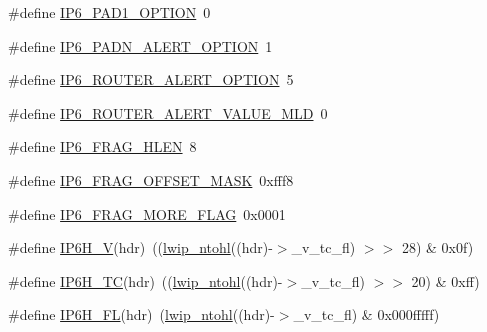 \begin{DoxyCompactItemize}
\#define \hyperlink{openmote-cc2538_2lwip_2src_2include_2lwip_2prot_2ip6_8h_a792e3f1465395652f1df6dd41cfa089a}{I\+P6\+\_\+\+P\+A\+D1\+\_\+\+O\+P\+T\+I\+ON}~0
\item 
\#define \hyperlink{openmote-cc2538_2lwip_2src_2include_2lwip_2prot_2ip6_8h_a42b8fada1fa942926239b86f91c11e03}{I\+P6\+\_\+\+P\+A\+D\+N\+\_\+\+A\+L\+E\+R\+T\+\_\+\+O\+P\+T\+I\+ON}~1
\item 
\#define \hyperlink{openmote-cc2538_2lwip_2src_2include_2lwip_2prot_2ip6_8h_a02ac672111b898fe0ab527329b05ce57}{I\+P6\+\_\+\+R\+O\+U\+T\+E\+R\+\_\+\+A\+L\+E\+R\+T\+\_\+\+O\+P\+T\+I\+ON}~5
\item 
\#define \hyperlink{openmote-cc2538_2lwip_2src_2include_2lwip_2prot_2ip6_8h_afb8daf0c5217efe957cd809074ca5f0b}{I\+P6\+\_\+\+R\+O\+U\+T\+E\+R\+\_\+\+A\+L\+E\+R\+T\+\_\+\+V\+A\+L\+U\+E\+\_\+\+M\+LD}~0
\item 
\#define \hyperlink{openmote-cc2538_2lwip_2src_2include_2lwip_2prot_2ip6_8h_aacda00cc76d9e7f9f3197de3b27089ea}{I\+P6\+\_\+\+F\+R\+A\+G\+\_\+\+H\+L\+EN}~8
\item 
\#define \hyperlink{openmote-cc2538_2lwip_2src_2include_2lwip_2prot_2ip6_8h_a4ada75ee94d08af1a0d2656e6d14d7d9}{I\+P6\+\_\+\+F\+R\+A\+G\+\_\+\+O\+F\+F\+S\+E\+T\+\_\+\+M\+A\+SK}~0xfff8
\item 
\#define \hyperlink{openmote-cc2538_2lwip_2src_2include_2lwip_2prot_2ip6_8h_a4e60dc945c0061d3d4dc4a84132a506b}{I\+P6\+\_\+\+F\+R\+A\+G\+\_\+\+M\+O\+R\+E\+\_\+\+F\+L\+AG}~0x0001
\item 
\#define \hyperlink{openmote-cc2538_2lwip_2src_2include_2lwip_2prot_2ip6_8h_a90f24cf50dee93e0729a1fc1d05374e3}{I\+P6\+H\+\_\+V}(hdr)~((\hyperlink{openmote-cc2538_2lwip_2src_2include_2lwip_2def_8h_a56098407d66feb75806f655bafbee81d}{lwip\+\_\+ntohl}((hdr)-\/$>$\+\_\+v\+\_\+tc\+\_\+fl) $>$$>$ 28) \& 0x0f)
\item 
\#define \hyperlink{openmote-cc2538_2lwip_2src_2include_2lwip_2prot_2ip6_8h_a09221519353bd18683c39a37905af968}{I\+P6\+H\+\_\+\+TC}(hdr)~((\hyperlink{openmote-cc2538_2lwip_2src_2include_2lwip_2def_8h_a56098407d66feb75806f655bafbee81d}{lwip\+\_\+ntohl}((hdr)-\/$>$\+\_\+v\+\_\+tc\+\_\+fl) $>$$>$ 20) \& 0xff)
\item 
\#define \hyperlink{openmote-cc2538_2lwip_2src_2include_2lwip_2prot_2ip6_8h_aca05b52650fd3d7d7806b7aaf3fe4aaf}{I\+P6\+H\+\_\+\+FL}(hdr)~(\hyperlink{openmote-cc2538_2lwip_2src_2include_2lwip_2def_8h_a56098407d66feb75806f655bafbee81d}{lwip\+\_\+ntohl}((hdr)-\/$>$\+\_\+v\+\_\+tc\+\_\+fl) \& 0x000fffff)
\item 

\end{DoxyCompactItemize}
